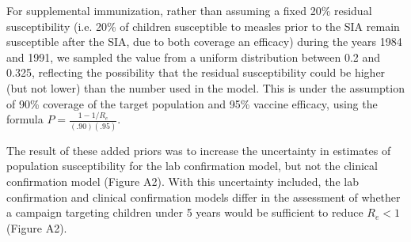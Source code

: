 For supplemental immunization, rather than assuming a fixed 20\% residual susceptibility (i.e. 20\% of children susceptible to measles prior to the SIA remain susceptible after the SIA, due to both coverage an efficacy) during the years 1984 and 1991, we sampled the value from a uniform distribution between 0.2 and 0.325, reflecting the possibility that the residual susceptibility could be higher (but not lower) than the number used in the model. This is under the assumption of 90\% coverage of the target population and 95\% vaccine efficacy, using the formula $P = \frac{1-1/R_e}{(.90)(.95)}$.  

The result of these added priors was to increase the uncertainty in estimates of population susceptibility for the lab confirmation model, but not the clinical confirmation model (Figure A2). With this uncertainty included, the lab confirmation and clinical confirmation models differ in the assessment of whether a campaign targeting children under 5 years would be sufficient to reduce $R_e < 1$ (Figure A2). 
